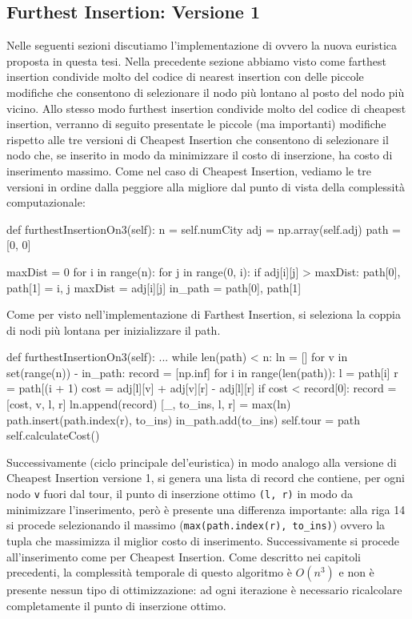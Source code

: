 \documentclass[a4paper,12pt]{report}
\begin{document}
\subsection{Furthest Insertion: Versione 1}
Nelle seguenti sezioni discutiamo l'implementazione di  ovvero la nuova euristica proposta in questa tesi. Nella precedente sezione abbiamo visto come farthest insertion condivide molto del codice di nearest insertion con delle piccole modifiche che consentono di selezionare il nodo più lontano al posto del nodo più vicino. Allo stesso modo furthest insertion condivide molto del codice di cheapest insertion, verranno di seguito presentate le piccole (ma importanti) modifiche rispetto alle tre versioni di Cheapest Insertion che consentono di selezionare il nodo che, se inserito in modo da minimizzare il costo di inserzione, ha costo di inserimento massimo. Come nel caso di Cheapest Insertion, vediamo le tre versioni in ordine dalla peggiore alla migliore dal punto di vista della complessità computazionale:
\begin{python}
def furthestInsertionOn3(self):
  n = self.numCity
  adj = np.array(self.adj)
  path = [0, 0]

  maxDist = 0
  for i in range(n):
    for j in range(0, i):
      if adj[i][j] > maxDist:
          path[0], path[1] = i, j
          maxDist = adj[i][j]
  in_path = {path[0], path[1]}
\end{python}
Come per visto nell'implementazione di Farthest Insertion, si seleziona la coppia di nodi più lontana per inizializzare il path. 
\begin{python}
def furthestInsertionOn3(self):
  ...
  while len(path) < n:
    ln = []
    for v in set(range(n)) - in_path:
      record = [np.inf]
      for i in range(len(path)):
        l = path[i]
        r = path[(i + 1) %
        cost = adj[l][v] + adj[v][r] - adj[l][r]
        if cost < record[0]:
          record = [cost, v, l, r]
      ln.append(record)
    [_, to_ins, l, r] = max(ln)
    path.insert(path.index(r), to_ins)
    in_path.add(to_ins)                
  self.tour = path
  self.calculateCost()
\end{python}
Successivamente (ciclo principale del'euristica) in modo analogo alla versione di Cheapest Insertion versione 1, si genera una lista di record che contiene, per ogni nodo \lstinline|v| fuori dal tour, il punto di inserzione ottimo \lstinline!(l, r)! in modo da minimizzare l'inserimento, però è presente una differenza importante: alla riga 14 si procede selezionando il massimo (\lstinline!max(path.index(r), to_ins)!) ovvero la tupla che massimizza il miglior costo di inserimento. Successivamente si procede all'inserimento come per Cheapest Insertion. \newline
Come descritto nei capitoli precedenti, la complessità temporale di questo algoritmo è $O(n^3)$ e non è presente nessun tipo di ottimizzazione: ad ogni iterazione è necessario ricalcolare completamente il punto di inserzione ottimo.
\end{document}
